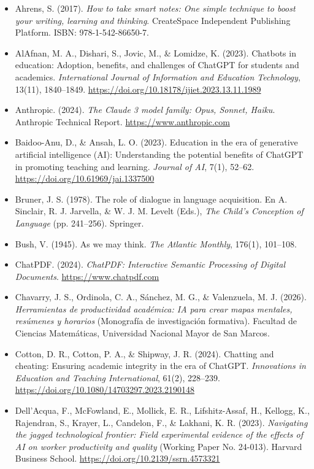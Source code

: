 \begin{itemize}[leftmargin=1.5em, label={}, itemsep=0.22ex, parsep=0pt]
\small\raggedright
{}
    \item Ahrens, S. (2017). \textit{How to take smart notes: One simple technique to boost your writing, learning and thinking}. CreateSpace Independent Publishing Platform. ISBN: 978-1-542-86650-7.
    \item AlAfnan, M. A., Dishari, S., Jovic, M., \& Lomidze, K. (2023). Chatbots in education: Adoption, benefits, and challenges of ChatGPT for students and academics. \textit{International Journal of Information and Education Technology}, 13(11), 1840--1849. \url{https://doi.org/10.18178/ijiet.2023.13.11.1989}
    \item Anthropic. (2024). \textit{The Claude 3 model family: Opus, Sonnet, Haiku}. Anthropic Technical Report. \url{https://www.anthropic.com}
    \item Baidoo-Anu, D., \& Ansah, L. O. (2023). Education in the era of generative artificial intelligence (AI): Understanding the potential benefits of ChatGPT in promoting teaching and learning. \textit{Journal of AI}, 7(1), 52--62. \url{https://doi.org/10.61969/jai.1337500}
    \item Bruner, J. S. (1978). The role of dialogue in language acquisition. En A. Sinclair, R. J. Jarvella, \& W. J. M. Levelt (Eds.), \textit{The Child's Conception of Language} (pp. 241--256). Springer.
    \item Bush, V. (1945). As we may think. \textit{The Atlantic Monthly}, 176(1), 101--108.
    \item ChatPDF. (2024). \textit{ChatPDF: Interactive Semantic Processing of Digital Documents}. \url{https://www.chatpdf.com}
    \item Chavarry, J. S., Ordinola, C. A., S{\'a}nchez, M. G., \& Valenzuela, M. J. (2026). \textit{Herramientas de productividad académica: IA para crear mapas mentales, resúmenes y horarios} (Monografía de investigación formativa). Facultad de Ciencias Matemáticas, Universidad Nacional Mayor de San Marcos.
    \item Cotton, D. R., Cotton, P. A., \& Shipway, J. R. (2024). Chatting and cheating: Ensuring academic integrity in the era of ChatGPT. \textit{Innovations in Education and Teaching International}, 61(2), 228--239. \url{https://doi.org/10.1080/14703297.2023.2190148}
    \item Dell'Acqua, F., McFowland, E., Mollick, E. R., Lifshitz-Assaf, H., Kellogg, K., Rajendran, S., Krayer, L., Candelon, F., \& Lakhani, K. R. (2023). \textit{Navigating the jagged technological frontier: Field experimental evidence of the effects of AI on worker productivity and quality} (Working Paper No. 24-013). Harvard Business School. \url{https://doi.org/10.2139/ssrn.4573321}

\end{itemize}
